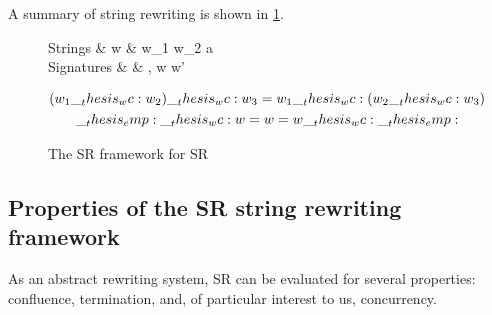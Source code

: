 A summary of string rewriting is shown in \cref{fig:string-rewriting:summary}.
\begin{figure}[tbp]
  \vspace*{\dimexpr-\abovedisplayskip-\abovecaptionskip\relax}
  \begin{syntax*}
    Strings &
      w & w_1 \wc w_2 \mid \emp \mid a
    \\
    Signatures &
      \srsig & \srsige \mid \srsig, w \reduces w'
  \end{syntax*}
  \begin{gather*}
    (w_1 \wc w_2) \wc w_3 = w_1 \wc (w_2 \wc w_3) \\
    \emp \wc w = w = w \wc \emp
  \end{gather*}
  \caption{The \acs*{SR} framework for \acl*{SR}}\label{fig:string-rewriting:summary}
\end{figure}

\subsection{Properties of the \acs*{SR} string rewriting framework}

As an abstract rewriting system, \ac{SR} can be evaluated for several properties: confluence, termination, and, of particular interest to us, concurrency.

